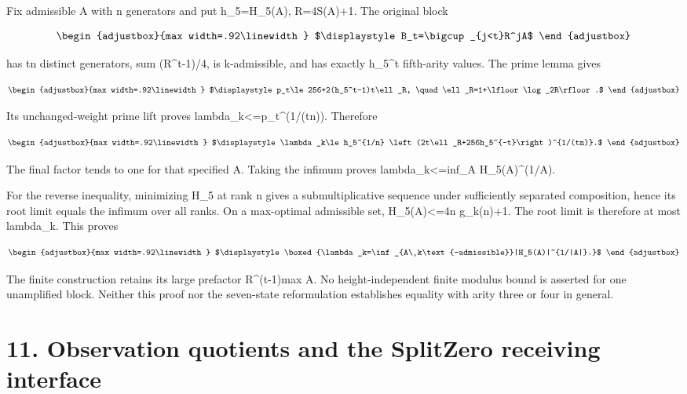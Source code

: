 Fix admissible A with n generators and put h\_5=\textbar H\_5(A)\textbar, R=4S(A)+1. The original block

\[
\begin{adjustbox}{max width=.92\linewidth}
$\displaystyle B_t=\bigcup_{j<t}R^jA$
\end{adjustbox}
\]

has tn distinct generators, sum (R\^{}t-1)/4, is k-admissible, and has exactly h\_5\^{}t fifth-arity values. The prime lemma gives

\[
\begin{adjustbox}{max width=.92\linewidth}
$\displaystyle p_t\le256+2(h_5^t-1)t\ell_R,
 \quad\ell_R=1+\lfloor\log_2R\rfloor.$
\end{adjustbox}
\]

Its unchanged-weight prime lift proves lambda\_k\textless=p\_t\^{}(1/(tn)). Therefore

\[
\begin{adjustbox}{max width=.92\linewidth}
$\displaystyle \lambda_k\le h_5^{1/n}
 \left(2t\ell_R+256h_5^{-t}\right)^{1/(tn)}.$
\end{adjustbox}
\]

The final factor tends to one for that specified A. Taking the infimum proves lambda\_k\textless=inf\_A \textbar H\_5(A)\textbar\^{}(1/\textbar A\textbar).

For the reverse inequality, minimizing \textbar H\_5\textbar{} at rank n gives a submultiplicative sequence under sufficiently separated composition, hence its root limit equals the infimum over all ranks. On a max-optimal admissible set, \textbar H\_5(A)\textbar\textless=4n g\_k(n)+1. The root limit is therefore at most lambda\_k. This proves

\[
\begin{adjustbox}{max width=.92\linewidth}
$\displaystyle \boxed{\lambda_k=\inf_{A\ k\text{-admissible}}|H_5(A)|^{1/|A|}.}$
\end{adjustbox}
\]

The finite construction retains its large prefactor R\^{}(t-1)max A. No height-independent finite modulus bound is asserted for one unamplified block. Neither this proof nor the seven-state reformulation establishes equality with arity three or four in general.

\section{11. Observation quotients and the SplitZero receiving interface}\label{n24-observation-quotients-and-the-splitzero-receiving-interface}

